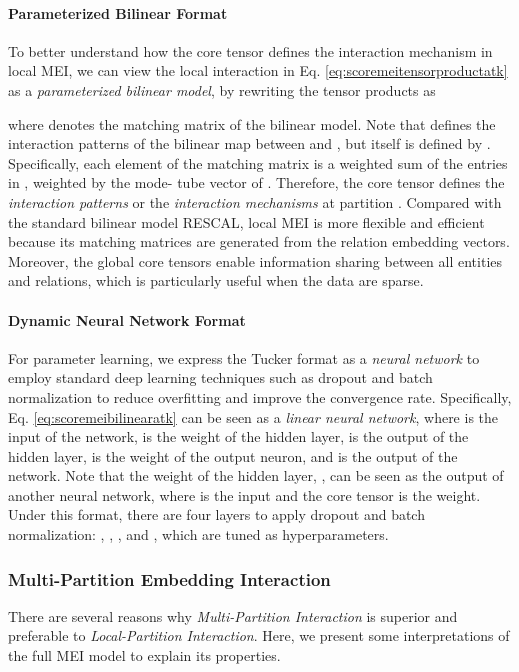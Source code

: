 \documentclass{ecai}
\theoremstyle{plain}  \newtheorem{thm}{Theorem}  \newtheorem{lem}[thm]{Lemma}  \newtheorem{prop}[thm]{Proposition}
\theoremstyle{remark}  \newtheorem*{rem}{Remark}
\begin{document}
\paragraph{Parameterized Bilinear Format}
To better understand how the core tensor defines the interaction mechanism in local MEI, we can view the local interaction in Eq. \ref{eq:scoremeitensorproductatk} as a \textit{parameterized bilinear model}, by rewriting the tensor products as 

where  denotes the matching matrix of the bilinear model. Note that  defines the interaction patterns of the bilinear map between  and , but itself is defined by . Specifically, each element  of the matching matrix  is a weighted sum of the entries in , weighted by the mode- tube vector  of . Therefore, the core tensor  defines the \textit{interaction patterns} or the \textit{interaction mechanisms} at partition . Compared with the standard bilinear model RESCAL, local MEI is more flexible and efficient because its matching matrices are generated from the relation embedding vectors. Moreover, the global core tensors enable information sharing between all entities and relations, which is particularly useful when the data are sparse.



\paragraph{Dynamic Neural Network Format}
For parameter learning, we express the Tucker format as a \textit{neural network} to employ standard deep learning techniques such as dropout \cite{srivastava_dropoutsimpleway_2014} and batch normalization \cite{ioffe_batchnormalizationaccelerating_2015} to reduce overfitting and improve the convergence rate. Specifically, Eq. \ref{eq:scoremeibilinearatk} can be seen as a \textit{linear neural network}, where  is the input of the network,  is the weight of the hidden layer,  is the output of the hidden layer,  is the weight of the output neuron, and  is the output of the network. Note that the weight of the hidden layer, , can be seen as the output of another neural network, where  is the input and the core tensor  is the weight. Under this format, there are four layers to apply dropout and batch normalization: , , , and , which are tuned as hyperparameters.

\subsubsection{Multi-Partition Embedding Interaction} \label{sect:fullmeitheory}
There are several reasons why \textit{Multi-Partition Interaction} is superior and preferable to \textit{Local-Partition Interaction}. Here, we present some interpretations of the full MEI model to explain its properties.
\end{document}
